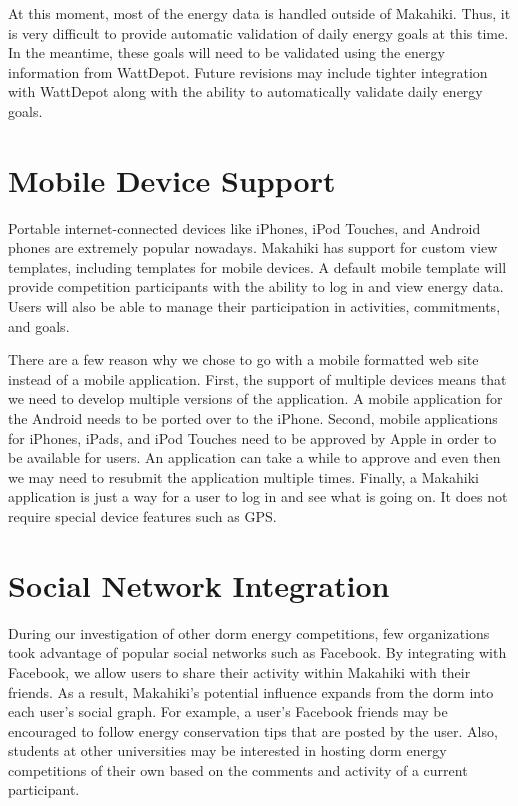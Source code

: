 At this moment, most of the energy data is handled outside of Makahiki.  Thus, it is very difficult to provide automatic validation of daily energy goals at this time.  In the meantime, these goals will need to be validated using the energy information from WattDepot.  Future revisions may include tighter integration with WattDepot along with the ability to automatically validate daily energy goals.

\section{Mobile Device Support}
\label{mobile}

Portable internet-connected devices like iPhones, iPod Touches, and Android phones are extremely popular nowadays.  Makahiki has support for custom view templates, including templates for mobile devices.  A default mobile template will provide competition participants with the ability to log in and view energy data.  Users will also be able to manage their participation in activities, commitments, and goals.

There are a few reason why we chose to go with a mobile formatted web site instead of a mobile application.  First, the support of multiple devices means that we need to develop multiple versions of the application.  A mobile application for the Android needs to be ported over to the iPhone. Second, mobile applications for iPhones, iPads, and iPod Touches need to be approved by Apple in order to be available for users.  An application can take a while to approve and even then we may need to resubmit the application multiple times.  Finally, a Makahiki application is just a way for a user to log in and see what is going on.  It does not require special device features such as GPS.

\section{Social Network Integration}
\label{socialint}

During our investigation of other dorm energy competitions, few organizations took advantage of popular social networks such as Facebook.  By integrating with Facebook, we allow users to share their activity within Makahiki with their friends.  As a result, Makahiki's potential influence expands from the dorm into each user's social graph.  For example, a user's Facebook friends may be encouraged to follow energy conservation tips that are posted by the user.  Also, students at other universities may be interested in hosting dorm energy competitions of their own based on the comments and activity of a current participant.

